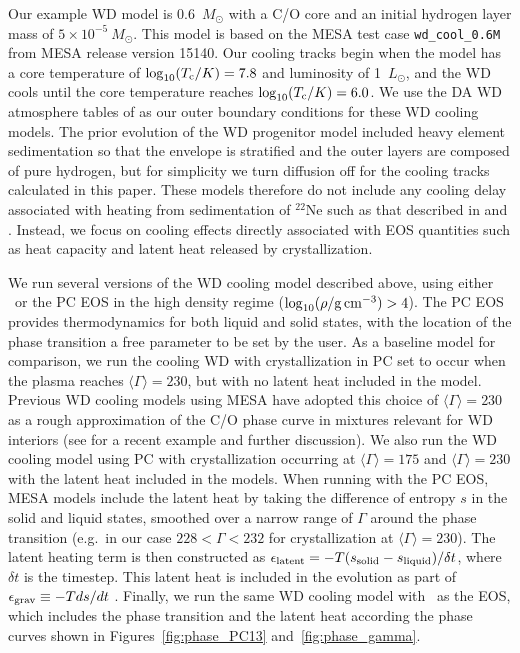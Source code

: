 Our example WD model is 0.6~$M_\odot$ with a C/O core and an initial
hydrogen layer mass of $5 \times 10^{-5}\ M_\odot$. This model is
based on the MESA test case \verb|wd_cool_0.6M| from MESA release
version 15140. Our cooling tracks begin when the model has a core
temperature of $\log_{10}(T_{\rm c}/K) = 7.8$ and luminosity of
1~$L_\odot$, and the WD cools until the core temperature reaches
$\log_{10}(T_{\rm c}/K) = 6.0$. We use the DA WD atmosphere tables of
\cite{Rohrmann12} as our outer boundary conditions for these WD
cooling models. The prior evolution of the WD progenitor model
included heavy element sedimentation so that the envelope is
stratified and the outer layers are composed of pure hydrogen, but for
simplicity we turn diffusion off for the cooling tracks calculated in
this paper. These models therefore do not include any cooling delay
associated with heating from sedimentation of $^{22}$Ne such as that
described in \cite{Paxton2018} and \cite{Bauer2020}. Instead, we focus
on cooling effects directly associated with EOS quantities such as
heat capacity and latent heat released by crystallization.

We run several versions of the WD cooling model described above, using
either \skye\ or the PC EOS in the high density regime
($\log_{10}(\rho/{\rm g\,cm^{-3}}) > 4$).
The PC EOS provides thermodynamics
for both liquid and solid states, with the location of the phase
transition a free parameter to be set by the user. As a baseline model
for comparison, we run the cooling WD with crystallization in PC set to
occur when the plasma reaches $\langle \Gamma \rangle = 230$, but with
no latent heat included in the model.
Previous WD cooling models using MESA have adopted this choice
of $\langle \Gamma \rangle = 230$ as a rough approximation of the C/O
phase curve in mixtures relevant for WD interiors (see
\cite{Bauer2020} for a recent example and further discussion).
We also run the WD cooling model using PC with crystallization
occurring at $\langle \Gamma \rangle = 175$ and $\langle \Gamma \rangle = 230$ with
the latent heat included in the models. 
When running with the PC EOS,
MESA models include the latent heat by taking the difference of entropy $s$
in the solid and liquid states, smoothed over a narrow range of
$\Gamma$ around the phase transition (e.g.\ in our case $228 < \Gamma < 232$
for crystallization at $\langle \Gamma \rangle = 230$). The latent
heating term is then constructed as
$\epsilon_{\rm latent} = -T (s_{\rm solid} - s_{\rm liquid})/\delta t$,
where $\delta t$ is the timestep. This latent heat is
included in the evolution as part of
$\epsilon_{\rm grav} \equiv -T ds/dt$ \citep{Paxton2018}. Finally, we
run the same WD cooling model with \skye\ as the EOS,
which includes the phase transition and the latent heat according
the phase curves shown in Figures~\ref{fig:phase_PC13}
and~\ref{fig:phase_gamma}.


